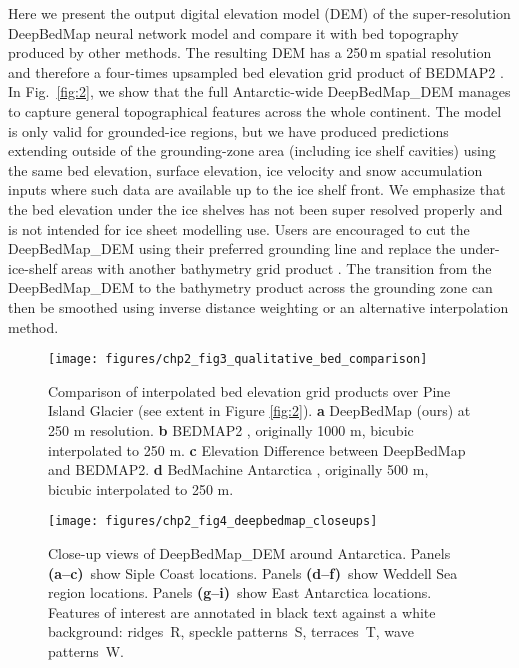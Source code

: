 Here we present the output digital elevation model (DEM) of the super-resolution DeepBedMap neural network model and compare it with bed topography produced by other methods.
The resulting DEM has a 250\,\unit{m} spatial resolution and therefore a four-times upsampled bed elevation grid product of BEDMAP2 \citep{FretwellBedmap2improvedice2013}.
In Fig.~\ref{fig:2}, we show that the full Antarctic-wide DeepBedMap\_DEM manages to capture general topographical features across the whole continent.
The model is only valid for grounded-ice regions, but we have produced predictions extending outside of the grounding-zone area (including ice shelf cavities) using the same bed elevation, surface elevation, ice velocity and snow accumulation inputs where such data are available up to the ice shelf front.
We emphasize that the bed elevation under the ice shelves has not been super resolved properly and is not intended for ice sheet modelling use.
Users are encouraged to cut the DeepBedMap\_DEM using their preferred grounding line \citep[e.g.][]{BindschadlerGettingAntarcticanew2011,RignotAntarcticgroundingline2011,MouginotMEaSURESAntarcticBoundaries2017} and replace the under-ice-shelf areas with another bathymetry grid product \citep[e.g.][]{GEBCOCompilationGroupGEBCO2020Grid2020}.
The transition from the DeepBedMap\_DEM to the bathymetry product across the grounding zone can then be smoothed using inverse distance weighting or an alternative interpolation method.

\begin{figure*}[t]
  \texttt{[image: figures/chp2\_fig3\_qualitative\_bed\_comparison]}
  \caption[2-D comparison of interpolated bed elevation grid products over Pine Island Glacier]{
    Comparison of interpolated bed elevation grid products over Pine Island Glacier (see extent in Figure \ref{fig:2}).
    \textbf{a} DeepBedMap (ours) at 250 m resolution.
    \textbf{b} BEDMAP2 \citep{FretwellBedmap2improvedice2013}, originally 1000 m, bicubic interpolated to 250 m.
    \textbf{c} Elevation Difference between DeepBedMap and BEDMAP2.
    \textbf{d} BedMachine Antarctica \citep{MorlighemMEaSUREsBedMachineAntarctica2019}, originally 500 m, bicubic interpolated to 250 m.
  }
  \label{fig:3}
\end{figure*}

\begin{figure*}[t]
  \texttt{[image: figures/chp2\_fig4\_deepbedmap\_closeups]}
  \caption[2-D Close-up views of DeepBedMap\_DEM over Antarctica]{
    Close-up views of DeepBedMap\_DEM around Antarctica.
    Panels \textbf{(a--c)}~show Siple Coast locations.
    Panels \textbf{(d--f)}~show Weddell Sea region locations.
    Panels \textbf{(g--i)}~show East Antarctica locations.
    Features of interest are annotated in black text against a white background:
    ridges~R, speckle patterns~S, terraces~T, wave patterns~W.
  }
  \label{fig:4}
\end{figure*}

